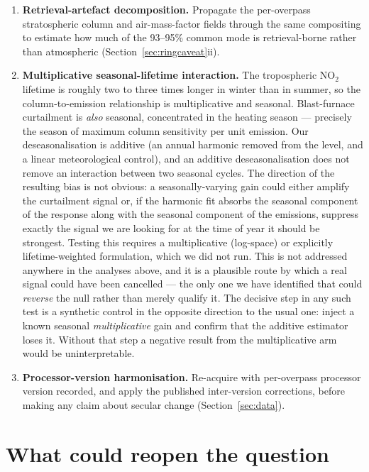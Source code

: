 \documentclass[11pt,a4paper]{article}
\providecommand{\ce}[1]{\ensuremath{\mathrm{#1}}}
\begin{document}
\begin{enumerate}[leftmargin=1.6em,itemsep=0.3em,label=\textbf{C\arabic*.}]
  before averaging, to test whether the faster-than-$1/\sqrt{N}$ noise decline is cancelling the
  source term rather than the background (Section~\ref{sec:flux}).
  \item \textbf{Retrieval-artefact decomposition.} Propagate the per-overpass stratospheric column
  and air-mass-factor fields through the same compositing to estimate how much of the 93--95\%
  common mode is retrieval-borne rather than atmospheric (Section~\ref{sec:ringcaveat}ii).
  \item \textbf{Multiplicative seasonal-lifetime interaction.} The tropospheric \ce{NO_2} lifetime
  is roughly two to three times longer in winter than in summer, so the column-to-emission
  relationship is multiplicative and seasonal. Blast-furnace curtailment is \emph{also} seasonal,
  concentrated in the heating season --- precisely the season of maximum column sensitivity per
  unit emission. Our deseasonalisation is additive (an annual harmonic removed from the level, and
  a linear meteorological control), and an additive deseasonalisation does not remove an
  interaction between two seasonal cycles. The direction of the resulting bias is not obvious: a
  seasonally-varying gain could either amplify the curtailment signal or, if the harmonic fit
  absorbs the seasonal component of the response along with the seasonal component of the
  emissions, suppress exactly the signal we are looking for at the time of year it should be
  strongest. Testing this requires a multiplicative (log-space) or explicitly
  lifetime-weighted formulation, which we did not run. This is not addressed anywhere in the
  analyses above, and it is a plausible route by which a real signal could have been cancelled ---
  the only one we have identified that could \emph{reverse} the null rather than merely qualify it.
  The decisive step in any such test is a synthetic control in the opposite direction to the usual
  one: inject a known seasonal \emph{multiplicative} gain and confirm that the additive estimator
  loses it. Without that step a negative result from the multiplicative arm would be
  uninterpretable.
  \item \textbf{Processor-version harmonisation.} Re-acquire with per-overpass processor version
  recorded, and apply the published inter-version corrections, before making any claim
  about secular change (Section~\ref{sec:data}).
\end{enumerate}

\section{What could reopen the question}
\label{sec:reopen}
\end{document}
